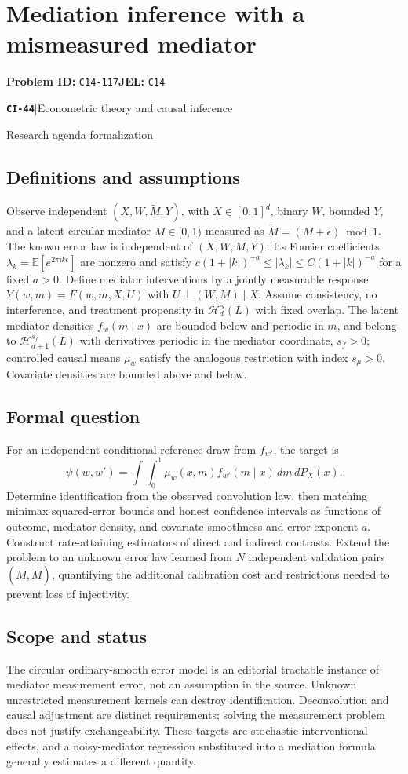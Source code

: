 \documentclass[11pt,a4paper]{article}
\newcommand{\E}{\mathbb E}
\newcommand{\entrymeta}[3]{{\sffamily\small\color{muted}\textbf{\texttt{#1}}\quad|\quad #2\par #3\par}}
\begin{document}
\section*{Mediation inference with a mismeasured mediator}
\textbf{Problem ID:} \texttt{C14-117}\quad \textbf{JEL:} \texttt{C14}\par
\label{problem:OP-0523}
\label{beyond:CI-44}
\entrymeta{CI-44}{Econometric theory and causal inference}{Research agenda formalization}
\subsection*{Definitions and assumptions}
Observe independent $(X,W,\widetilde M,Y)$, with $X\in[0,1]^d$, binary $W$, bounded $Y$, and a latent circular mediator $M\in[0,1)$ measured as $\widetilde M=(M+\epsilon)\bmod1$. The known error law is independent of $(X,W,M,Y)$. Its Fourier coefficients $\lambda_k=\E[e^{2\pi\mathrm i k\epsilon}]$ are nonzero and satisfy $c(1+|k|)^{-a}\leq|\lambda_k|\leq C(1+|k|)^{-a}$ for a fixed $a>0$. Define mediator interventions by a jointly measurable response $Y(w,m)=F(w,m,X,U)$ with $U\perp(W,M)\mid X$. Assume consistency, no interference, and treatment propensity in $\mathcal H_d^\alpha(L)$ with fixed overlap. The latent mediator densities $f_w(m\mid x)$ are bounded below and periodic in $m$, and belong to $\mathcal H_{d+1}^{s_f}(L)$ with derivatives periodic in the mediator coordinate, $s_f>0$; controlled causal means $\mu_w$ satisfy the analogous restriction with index $s_\mu>0$. Covariate densities are bounded above and below.
\subsection*{Formal question}
For an independent conditional reference draw from $f_{w'}$, the target is
\[
 \psi(w,w')=\int\!\int_0^1
 \mu_w(x,m)f_{w'}(m\mid x)\,dm\,dP_X(x).
\]
Determine identification from the observed convolution law, then matching minimax squared-error bounds and honest confidence intervals as functions of outcome, mediator-density, and covariate smoothness and error exponent $a$. Construct rate-attaining estimators of direct and indirect contrasts. Extend the problem to an unknown error law learned from $N$ independent validation pairs $(M,\widetilde M)$, quantifying the additional calibration cost and restrictions needed to prevent loss of injectivity.
\subsection*{Scope and status}
The circular ordinary-smooth error model is an editorial tractable instance of mediator measurement error, not an assumption in the source. Unknown unrestricted measurement kernels can destroy identification. Deconvolution and causal adjustment are distinct requirements; solving the measurement problem does not justify exchangeability. These targets are stochastic interventional effects, and a noisy-mediator regression substituted into a mediation formula generally estimates a different quantity.
\end{document}
